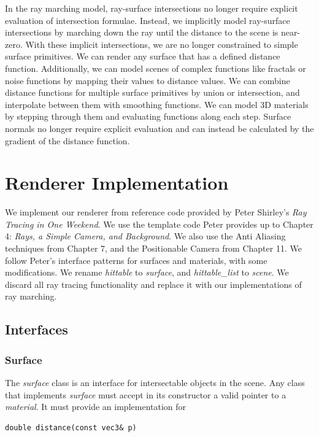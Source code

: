 \documentclass[sigconf, nonacm]{acmart}
\begin{document}
In the ray marching model, ray-surface intersections no longer require explicit evaluation of intersection formulae. Instead, we implicitly model ray-surface intersections by marching down the ray until the distance to the scene is near-zero. With these implicit intersections, we are no longer constrained to simple surface primitives. We can render any surface that has a defined distance function. Additionally, we can model scenes of complex functions like fractals or noise functions by mapping their values to distance values. We can combine distance functions for multiple surface primitives by union or intersection, and interpolate between them with smoothing functions. We can model 3D materials by stepping through them and evaluating functions along each step. Surface normals no longer require explicit evaluation and can instead be calculated by the gradient of the distance function.

\section{Renderer Implementation}

We implement our renderer from reference code provided by Peter Shirley's \textit{Ray Tracing in One Weekend}. We use the template code Peter provides up to Chapter 4: \textit{Rays, a Simple Camera, and Background}. We also use the Anti Aliasing techniques from Chapter 7, and the Positionable Camera from Chapter 11. We follow Peter's interface patterns for surfaces and materials, with some modifications. We rename \textit{hittable} to \textit{surface}, and \textit{hittable\_list} to \textit{scene}. We discard all ray tracing functionality and replace it with our implementations of ray marching.

\subsection{Interfaces}

\subsubsection{Surface}

The \textit{surface} class is an interface for intersectable objects in the scene. Any class that implements \textit{surface} must accept in its constructor a valid pointer to a \textit{material}. It must provide an implementation for

\begin{lstlisting}
double distance(const vec3& p)
\end{lstlisting}
\end{document}
